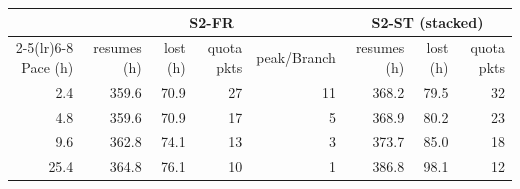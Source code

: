 \begin{tabular}{rrrrrrrr}
\toprule
 & \multicolumn{4}{c}{S2-FR} & \multicolumn{3}{c}{S2-ST (stacked)}\\
\cmidrule(lr){2-5}\cmidrule(lr){6-8}
Pace (h) & resumes (h) & lost (h) & quota pkts & peak/Branch & resumes (h) & lost (h) & quota pkts\\
\midrule
2.4 & 359.6 & 70.9 & 27 & 11 & 368.2 & 79.5 & 32\\
4.8 & 359.6 & 70.9 & 17 & 5 & 368.9 & 80.2 & 23\\
9.6 & 362.8 & 74.1 & 13 & 3 & 373.7 & 85.0 & 18\\
25.4 & 364.8 & 76.1 & 10 & 1 & 386.8 & 98.1 & 12\\
\bottomrule
\end{tabular}
